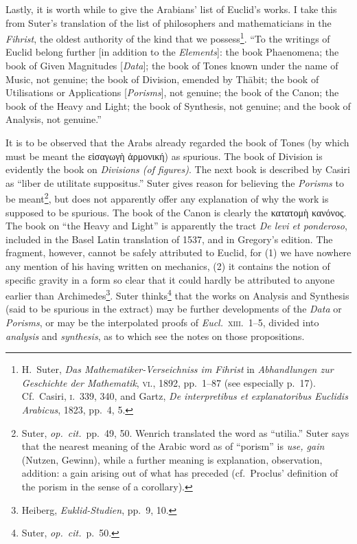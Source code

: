 Lastly, it is worth while to give the Arabians' list of Euclid's works. I take this from Suter's translation of the list of philosophers and mathematicians in the \emph{Fihrist}, the oldest authority of the kind that we possess\footnote{H.~Suter, \emph{Das Mathematiker-Verseichniss im Fihrist} in \emph{Abhandlungen zur Geschichte der Mathematik}, \textsc{vi.}, 1892, pp.~1--87 (see especially p.~17). Cf.\ Casiri, \textsc{i}.\ 339, 340, and Gartz, \emph{De interpretibus et explanatoribus Euclidis Arabicus}, 1823, pp.~4, 5.}. ``To the writings of Euclid belong further [in addition to the \emph{Elements}]: the book Phaenomena; the book of Given Magnitudes [\emph{Data}]; the book of Tones known under the name of Music, not genuine; the book of Division, emended by Thābit; the book of Utilisations or Applications [\emph{Porisms}], not genuine; the book of the Canon; the book of the Heavy and Light; the book of Synthesis, not genuine; and the book of Analysis, not genuine.''

It is to be observed that the Arabs already regarded the book of Tones (by which must be meant the εἰσαγωγὴ ἁρμονική) as spurious. The book of Division is evidently the book on \emph{Divisions (of figures)}. The next book is described by Casiri as ``liber de utilitate suppositus.'' Suter gives reason for believing the \emph{Porisms} to be meant\footnote{Suter, \emph{op.~cit.}\ pp.~49, 50. Wenrich translated the word as ``utilia.'' Suter says that the nearest meaning of the Arabic word as of ``porism'' is \emph{use, gain} (Nutzen, Gewinn), while a further meaning is explanation, observation, addition: a gain arising out of what has preceded (cf.\ Proclus' definition of the porism in the sense of a corollary).}, but does not apparently offer any explanation of why the work is supposed to be spurious. The book of the Canon is clearly the κατατομὴ κανόνος. The book on ``the Heavy and Light'' is apparently the tract \emph{De levi et ponderoso}, included in the Basel Latin translation of 1537, and in Gregory's edition. The fragment, however, cannot be safely attributed to Euclid, for (1) we have nowhere any mention of his having written on mechanics, (2) it contains the notion of specific gravity in a form so clear that it could hardly be attributed to anyone earlier than Archimedes\footnote{Heiberg, \emph{Euklid-Studien}, pp.~9, 10.}. Suter thinks\footnote{Suter, \emph{op.~cit.}\ p.~50.} that the works on Analysis and Synthesis (said to be spurious in the extract) may be further developments of the \emph{Data} or \emph{Porisms}, or may be the interpolated proofs of \emph{Eucl.}~\textsc{xiii.}~1--5, divided into \emph{analysis} and \emph{synthesis}, as to which see the notes on those propositions.